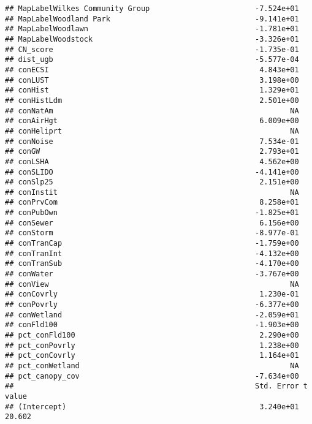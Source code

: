 \documentclass[]{article}
\begin{document}
\begin{verbatim}
## MapLabelWilkes Community Group                        -7.524e+01
## MapLabelWoodland Park                                 -9.141e+01
## MapLabelWoodlawn                                      -1.781e+01
## MapLabelWoodstock                                     -3.326e+01
## CN_score                                              -1.735e-01
## dist_ugb                                              -5.577e-04
## conECSI                                                4.843e+01
## conLUST                                                3.198e+00
## conHist                                                1.329e+01
## conHistLdm                                             2.501e+00
## conNatAm                                                      NA
## conAirHgt                                              6.009e+00
## conHeliprt                                                    NA
## conNoise                                               7.534e-01
## conGW                                                  2.793e+01
## conLSHA                                                4.562e+00
## conSLIDO                                              -4.141e+00
## conSlp25                                               2.151e+00
## conInstit                                                     NA
## conPrvCom                                              8.258e+01
## conPubOwn                                             -1.825e+01
## conSewer                                               6.156e+00
## conStorm                                              -8.977e-01
## conTranCap                                            -1.759e+00
## conTranInt                                            -4.132e+00
## conTranSub                                            -4.170e+00
## conWater                                              -3.767e+00
## conView                                                       NA
## conCovrly                                              1.230e-01
## conPovrly                                             -6.377e+00
## conWetland                                            -2.059e+01
## conFld100                                             -1.903e+00
## pct_conFld100                                          2.290e+00
## pct_conPovrly                                          1.238e+00
## pct_conCovrly                                          1.164e+01
## pct_conWetland                                                NA
## pct_canopy_cov                                        -7.634e+00
##                                                       Std. Error t value
## (Intercept)                                            3.240e+01  20.602

\end{verbatim}
\end{document}
